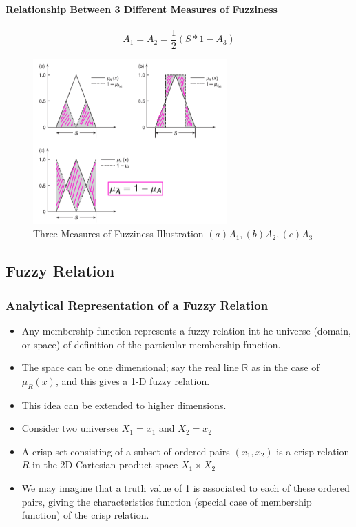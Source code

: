 \documentclass{tron}
\begin{document}
\paragraph{Relationship Between 3 Different Measures of Fuzziness}
\begin{equation}
	A_1 = A_2 = \frac12 (S * 1 - A_3)
\end{equation}
\begin{figure}[H]
	\centering
	\includegraphics[height=240px]{Figs/Fuzzy/fuzziness-measure}
	\caption{Three Measures of Fuzziness Illustration $(a)A_1, (b)A_2, (c)A_3$}
	\label{fig:fuzzy:fuzziness:ex}
\end{figure}



\clearpage
\subsection{Fuzzy Relation}

\subsubsection{Analytical Representation of a Fuzzy Relation}
\begin{itemize}
	\item Any membership function represents a fuzzy relation int he universe (domain, or space) of definition of the particular membership function.
	\item The space can be one dimensional; say the real line $\mathbb{R}$ as in the case of $\mu_R(x)$, and this gives a 1-D fuzzy relation.
	\item This idea can be extended to higher dimensions.
	\item Consider two universes $X_1 = {x_1}$ and $X_2 = {x_2}$
	\item A crisp set consisting of a subset of ordered pairs $(x_1, x_2)$ is a crisp relation $R$ in the 2D Cartesian product space $X_1 \times X_2$
	\item We may imagine that a truth value of 1 is associated to each of these ordered pairs, giving the characteristics function (special case of membership function) of the crisp relation.
\end{itemize}
\end{document}
